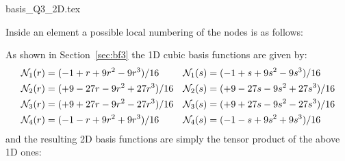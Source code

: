 \begin{flushright} {\tiny {\color{gray} basis\_Q3\_2D.tex}} \end{flushright}

Inside an element a possible local numbering of the nodes is as follows:



As shown in Section~\ref{sec:bf3} the 1D cubic basis functions are given by:
\begin{align}
{\mathcal{N}}_1(r)&=(-1   +r +9r^2 - 9r^3)/16 & {\mathcal{N}}_1(s)&=(-1   +s +9s^2 - 9s^3)/16 \nonumber\\
{\mathcal{N}}_2(r)&=(+9 -27r -9r^2 +27r^3)/16 & {\mathcal{N}}_2(s)&=(+9 -27s -9s^2 +27s^3)/16 \nonumber\\
{\mathcal{N}}_3(r)&=(+9 +27r -9r^2 -27r^3)/16 & {\mathcal{N}}_3(s)&=(+9 +27s -9s^2 -27s^3)/16 \nonumber\\
{\mathcal{N}}_4(r)&=(-1   -r +9r^2 + 9r^3)/16 & {\mathcal{N}}_4(s)&=(-1   -s +9s^2 + 9s^3)/16 \nonumber
\end{align}
and the resulting 2D basis functions are simply the tensor product of the above 1D ones:

